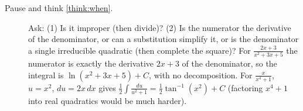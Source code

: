 \documentclass[11pt]{article}
\begin{document}
\begin{description}
  \item[Pause and think \ref{think:when}.] Ask: (1) Is it improper (then divide)? (2) Is the numerator the derivative of the denominator, or can a substitution simplify it, or is the denominator a single irreducible quadratic (then complete the square)? For $\frac{2x+3}{x^2+3x+5}$ the numerator is exactly the derivative $2x+3$ of the denominator, so the integral is $\ln(x^2+3x+5)+C$, with no decomposition. For $\frac x{x^4+1}$, $u=x^2$, $du=2x\,dx$ gives $\frac12\int\frac{du}{u^2+1}=\frac12\tan^{-1}(x^2)+C$ (factoring $x^4+1$ into real quadratics would be much harder).
\end{description}
\end{document}
